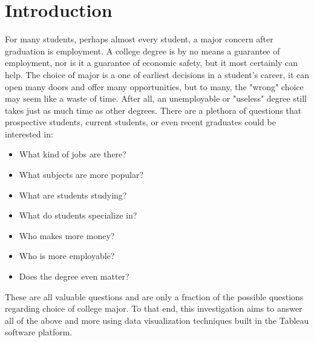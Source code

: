 \documentclass[sigchi]{acmart}
\begin{document}



\maketitle

\section{Introduction}

For many students, perhaps almost every student, a major concern after graduation is employment. A college degree is by no means a guarantee of employment, nor is it a guarantee of economic safety, but it most certainly can help. The choice of major is a one of earliest decisions in a student's career, it can open many doors and offer many opportunities, but to many, the "wrong" choice may seem like a waste of time. After all, an unemployable or "useless" degree still takes just as much time as other degrees. There are a plethora of questions that prospective students, current students, or even recent graduates could be interested in: 
\begin{itemize}
\item{What kind of jobs are there?}
\item{What subjects are more popular?}
\item{What are students studying?}
\item{What do students specialize in?}
\item{Who makes more money?}
\item{Who is more employable?}
\item{Does the degree even matter?}
\end{itemize}
These are all valuable questions and are only a fraction of the possible questions regarding choice of college major. To that end, this investigation aims to answer all of the above and more using data visualization techniques built in the Tableau software platform.
\end{document}
